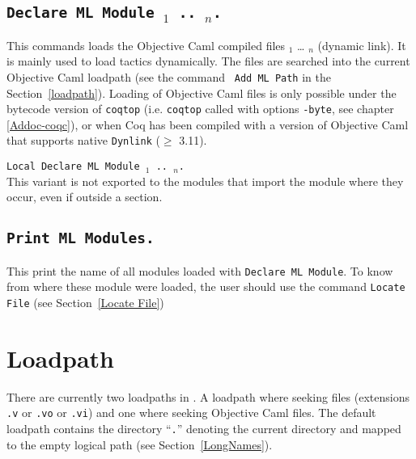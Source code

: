 \subsection[\tt Declare ML Module {\str$_1$} .. {\str$_n$}.]{\tt Declare ML Module {\str$_1$} .. {\str$_n$}.}
This commands loads the Objective Caml compiled files {\str$_1$} {\ldots}
{\str$_n$} (dynamic link). It is mainly used to load tactics
dynamically.
 The files are
searched into the current Objective Caml loadpath (see the command {\tt
Add ML Path} in the Section~\ref{loadpath}).  Loading of Objective Caml
files is only possible under the bytecode version of {\tt coqtop}
(i.e. {\tt coqtop} called with options {\tt -byte}, see chapter 
\ref{Addoc-coqc}), or when Coq has been compiled with a version of
Objective Caml that supports native {\tt Dynlink} ($\ge$ 3.11).

\begin{Variants}
\item {\tt Local Declare ML Module {\str$_1$} .. {\str$_n$}.}\\
  This variant is not exported to the modules that import the module
  where they occur, even if outside a section.
\end{Variants}

\begin{ErrMsgs}
\item {}
\item {}
\end{ErrMsgs}

\subsection[\tt Print ML Modules.]{\tt Print ML Modules.}
This print the name of all \ocaml{} modules loaded with \texttt{Declare
  ML Module}. To know from where these module were loaded, the user
should use the command \texttt{Locate File} (see Section~\ref{Locate File})

\section[Loadpath]{Loadpath\label{loadpath}}

There are currently two loadpaths in \Coq. A loadpath where seeking
{\Coq} files (extensions {\tt .v} or {\tt .vo} or {\tt .vi}) and one where
seeking Objective Caml files. The default loadpath contains the
directory ``\texttt{.}'' denoting the current directory and mapped to the empty logical path (see Section~\ref{LongNames}).

